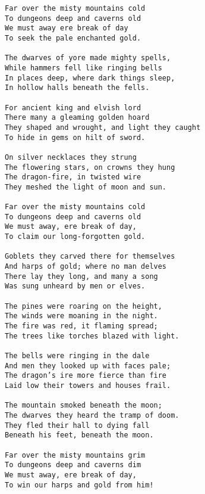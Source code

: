 \documentclass{article}
\begin{document}
\begin{verbatim}
Far over the misty mountains cold
To dungeons deep and caverns old
We must away ere break of day
To seek the pale enchanted gold.

The dwarves of yore made mighty spells,
While hammers fell like ringing bells
In places deep, where dark things sleep,
In hollow halls beneath the fells.

For ancient king and elvish lord
There many a gleaming golden hoard
They shaped and wrought, and light they caught
To hide in gems on hilt of sword.

On silver necklaces they strung
The flowering stars, on crowns they hung
The dragon-fire, in twisted wire
They meshed the light of moon and sun.

Far over the misty mountains cold
To dungeons deep and caverns old
We must away, ere break of day,
To claim our long-forgotten gold.

Goblets they carved there for themselves
And harps of gold; where no man delves
There lay they long, and many a song
Was sung unheard by men or elves.

The pines were roaring on the height,
The winds were moaning in the night.
The fire was red, it flaming spread;
The trees like torches blazed with light.

The bells were ringing in the dale
And men they looked up with faces pale;
The dragon’s ire more fierce than fire
Laid low their towers and houses frail.

The mountain smoked beneath the moon;
The dwarves they heard the tramp of doom.
They fled their hall to dying fall
Beneath his feet, beneath the moon.

Far over the misty mountains grim
To dungeons deep and caverns dim
We must away, ere break of day,
To win our harps and gold from him!
\end{verbatim}
\end{document}
